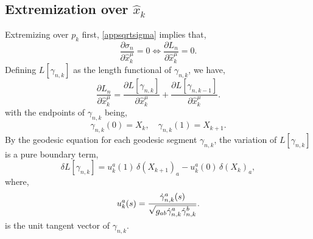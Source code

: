 \documentclass[reprint,amsmath,amssymb,aps,nofootinbib,twocolumn]{revtex4-2}
\begin{document}
\begin{appendix}
\subsection{Extremization over $ \hat{x}_k $}

Extremizing over $ p_k $ first, \eqref{appsqrtsigma} implies that,
\begin{equation}
\frac{\partial \sigma_n}{\partial \hat{x}^{\mu}_k} = 0 \iff \frac{\partial L_n}{\partial \hat{x}^{\mu}_k} = 0.
\label{Lext}
\end{equation}
Defining $L[\gamma_{n,k}]$ as the length functional of $\gamma_{n,k}$, we have,
\begin{equation}
\frac{\partial L_n}{\partial \hat{x}^{\mu}_k} = \frac{\partial L[\gamma_{n,k}]}{\partial \hat{x}^{\mu}_k}+ \frac{\partial L[\gamma_{n,k-1}]}{\partial \hat{x}^{\mu}_k}.
\label{Lnvar}
\end{equation}
with the endpoints of $\gamma_{n,k}$ being,
\begin{equation}
\gamma_{n,k}(0) = X_k, \quad \gamma_{n,k}(1) = X_{k+1}.
\end{equation}
By the geodesic equation for each geodesic segment $ \gamma_{n,k} $, the variation of $L[\gamma_{n,k}]$ is a pure boundary term,
\begin{equation}
\delta L[\gamma_{n,k}] = u^{a}_{k}(1)\,\delta (X_{k+1})_a - u^{a}_{k}(0)\,\delta (X_{k})_a,
\end{equation}
where,
\begin{equation}
u^{a}_{k}(s)  = \frac{\dot{\gamma}_{n,k}^{a}(s)}{\sqrt{\smash[b]{g_{ab}\dot{\gamma}^{a}_{n,k}\dot{\gamma}^{b}_{n,k}}}}. %
\end{equation}
is the unit tangent vector of $\gamma_{n,k}$.


\end{appendix}
\end{document}
